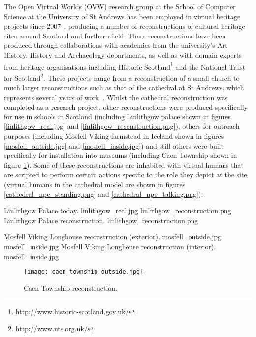 The Open Virtual Worlds (OVW) research group at the School of Computer Science at the University of St Andrews has been employed in virtual heritage projects since 2007~\cite{Getchell2007}, producing a number of reconstructions of cultural heritage sites around Scotland and further afield. These reconstructions have been produced through collaborations with academics from the university's Art History, History and Archaeology departments, as well as with domain experts from heritage organisations including Historic Scotland\footnote{\url{http://www.historic-scotland.gov.uk/}} and the National Trust for Scotland\footnote{\url{http://www.nts.org.uk/}}. These projects range from a reconstruction of a small church to much larger reconstructions such as that of the cathedral at St Andrews, which represents several years of work~\cite{Kennedy2013}. Whilst the cathedral reconstruction was completed as a research project, other reconstructions were produced specifically for use in schools in Scotland (including Linlithgow palace shown in figures \ref{linlithgow_real.jpg} and \ref{linlithgow_reconstruction.png}), others for outreach purposes (including Mosfell Viking farmstead in Iceland shown in figures \ref{mosfell_outside.jpg} and \ref{mosfell_inside.jpg}) and still others were built specifically for installation into museums (including Caen Township shown in figure  \ref{caen_township_outside.jpg}). Some of these reconstructions are inhabited with virtual humans that are scripted to perform certain actions specific to the role they depict at the site (virtual humans in the cathedral model are shown in figures \ref{cathedral_npc_standing.png} and \ref{cathedral_npc_talking.png}).

 {Linlithgow Palace today.} {linlithgow_real.jpg}
       {linlithgow_reconstruction.png} {Linlithgow Palace reconstruction.} {linlithgow_reconstruction.png}

 {Mosfell Viking Longhouse reconstruction (exterior).} {mosfell_outside.jpg}
	   {mosfell_inside.jpg} {Mosfell Viking Longhouse reconstruction (interior).} {mosfell_inside.jpg}


\begin{figure}[h]
\centering
  \texttt{[image: caen\_township\_outside.jpg]}
  \caption{Caen Township reconstruction.}
  \label{caen_township_outside.jpg}
\end{figure}

